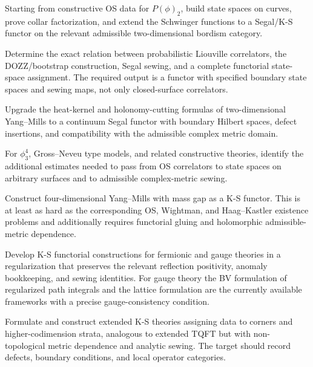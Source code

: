 \begin{openproblem}
Starting from constructive OS data for \(P(\phi)_2\), build state spaces on
curves, prove collar factorization, and extend the Schwinger functions to a
Segal/K-S functor on the relevant admissible two-dimensional bordism
category.
\end{openproblem}

\begin{openproblem}
Determine the exact relation between probabilistic Liouville correlators,
the DOZZ/bootstrap construction, Segal sewing, and a complete functorial
state-space assignment.  The required output is a functor with specified
boundary state spaces and sewing maps, not only closed-surface correlators.
\end{openproblem}

\begin{openproblem}
Upgrade the heat-kernel and holonomy-cutting formulas of two-dimensional
Yang--Mills to a continuum Segal functor with boundary Hilbert spaces,
defect insertions, and compatibility with the admissible complex metric
domain.
\end{openproblem}

\begin{openproblem}
For \(\phi^4_3\), Gross--Neveu type models, and related constructive
theories, identify the additional estimates needed to pass from OS
correlators to state spaces on arbitrary surfaces and to admissible
complex-metric sewing.
\end{openproblem}

\begin{openproblem}
Construct four-dimensional Yang--Mills with mass gap as a K-S functor.  This
is at least as hard as the corresponding OS, Wightman, and Haag--Kastler
existence problems and additionally requires functorial gluing and
holomorphic admissible-metric dependence.
\end{openproblem}

\begin{openproblem}
Develop K-S functorial constructions for fermionic and gauge theories in a
regularization that preserves the relevant reflection positivity, anomaly
bookkeeping, and sewing identities.  For gauge theory the BV formulation of
regularized path integrals and the lattice formulation are the currently
available frameworks with a precise gauge-consistency condition.
\end{openproblem}

\begin{openproblem}
Formulate and construct extended K-S theories assigning data to corners and
higher-codimension strata, analogous to extended TQFT but with non-topological
metric dependence and analytic sewing.  The target should record defects,
boundary conditions, and local operator categories.
\end{openproblem}
